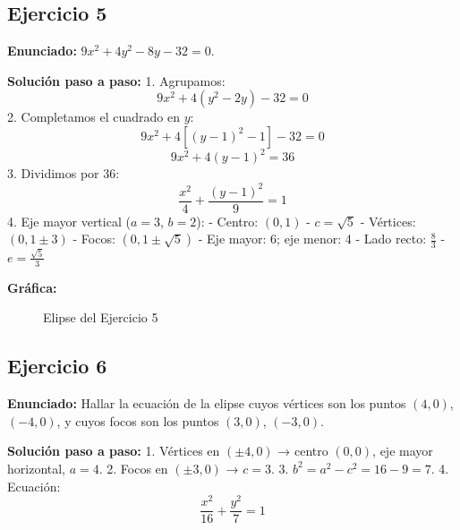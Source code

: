 \documentclass[12pt,a4paper]{article}
\begin{document}
\subsection{Ejercicio 5}
\textbf{Enunciado:} \(9x^2 + 4y^2 - 8y - 32 = 0\).

\textbf{Solución paso a paso:}
1. Agrupamos:
   \[
   9x^2 + 4(y^2 - 2y) - 32 = 0
   \]
2. Completamos el cuadrado en \(y\):
   \[
   9x^2 + 4[(y-1)^2 - 1] - 32 = 0
   \]
   \[
   9x^2 + 4(y-1)^2 = 36
   \]
3. Dividimos por 36:
   \[
   \frac{x^2}{4} + \frac{(y-1)^2}{9} = 1
   \]
4. Eje mayor vertical (\(a=3\), \(b=2\)):
   - Centro: \((0, 1)\)
   - \(c = \sqrt{5}\)
   - Vértices: \((0, 1 \pm 3)\)
   - Focos: \((0, 1 \pm \sqrt{5})\)
   - Eje mayor: 6; eje menor: 4
   - Lado recto: \(\frac{8}{3}\)
   - \(e = \frac{\sqrt{5}}{3}\)

\textbf{Gráfica:}
\begin{figure}[H]
\centering
{}
\caption{Elipse del Ejercicio 5}
\end{figure}
\newpage

\subsection{Ejercicio 6}
\textbf{Enunciado:} Hallar la ecuación de la elipse cuyos vértices son los puntos \((4,0)\), \((-4,0)\), y cuyos focos son los puntos \((3,0)\), \((-3,0)\).

\textbf{Solución paso a paso:}
1. Vértices en \((\pm 4, 0)\) → centro \((0,0)\), eje mayor horizontal, \(a=4\).
2. Focos en \((\pm 3, 0)\) → \(c=3\).
3. \(b^2 = a^2 - c^2 = 16 - 9 = 7\).
4. Ecuación:
   \[
   \frac{x^2}{16} + \frac{y^2}{7} = 1
   \]
\end{document}
